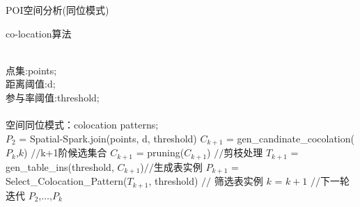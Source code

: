 \begin{frame}[t]{POI空间分析(同位模式)}

\begin{algorithm}[H]
\footnotesize
\caption{co-location算法}
\begin{algorithmic}[1]   
\REQUIRE  ~~\\  
点集:points;\\  
距离阈值:d;\\
参与率阈值:threshold;\\  
\ENSURE ~~\\  
空间同位模式：colocation patterns; \\
\pause
\STATE $P_2$ = Spatial-Spark.join(points, d, threshold)
\pause
\STATE $C_{k+1}$ = gen\_candinate\_cocolation($P_k$,$k$) $//$k+1阶候选集合
\pause
\STATE $C_{k+1}$ = pruning($C_{k+1}$) $//$剪枝处理
\pause
\STATE $T_{k+1}$ = gen\_table\_ins(threshold, $C_{k+1}$)$//$生成表实例
\pause
\STATE $P_{k+1}$ = Select\_Colocation\_Pattern($T_{k+1}$, threshold) $//$ 筛选表实例
\pause
\STATE $k$ = $k+1$ $//$下一轮迭代
\pause
\ENDWHILE 
\pause
\RETURN $P_2$,$\dots$,$P_k$
\end{algorithmic}
\end{algorithm} 
\end{frame}


